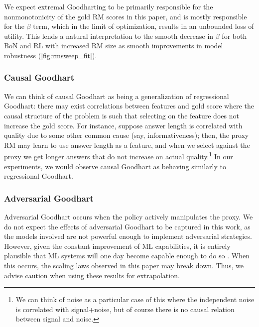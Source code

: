 \documentclass{article}
\theoremstyle{plain}
\begin{document}
We expect extremal Goodharting to be primarily responsible for the nonmonotonicity of the gold RM scores in this paper, and is mostly responsible for the $\beta$ term, which in the limit of optimization, results in an unbounded loss of utility. This lends a natural interpretation to the smooth decrease in $\beta$ for both BoN and RL with increased RM size as smooth improvements in model robustness
(\cref{fig:rmsweep_fit}).




\subsubsection{Causal Goodhart}

We can think of causal Goodhart as being a generalization of regressional Goodhart: there may exist correlations between features and gold score where the causal structure of the problem is such that selecting on the feature does not increase the gold score. For instance, suppose answer length is correlated with quality due to some other common cause (say, informativeness); then, the proxy RM may learn to use answer length as a feature, and when we select against the proxy we get longer answers that do not increase on actual quality.\footnote{We can think of noise as a particular case of this where the independent noise is correlated with signal+noise, but of course there is no causal relation between signal and noise.} In our experiments, we would observe causal Goodhart as behaving similarly to regressional Goodhart. 

\subsubsection{Adversarial Goodhart}

Adversarial Goodhart occurs when the policy actively manipulates the proxy. We do not expect the effects of adversarial Goodhart to be captured in this work, as the models involved are not powerful enough to implement adversarial strategies. However, given the constant improvement of ML capabilities, it is entirely plausible that ML systems will one day become capable enough to do so \citep{hubinger2019rlo}. When this occurs, the scaling laws observed in this paper may break down. Thus, we advise caution when using these results for extrapolation.
\end{document}

